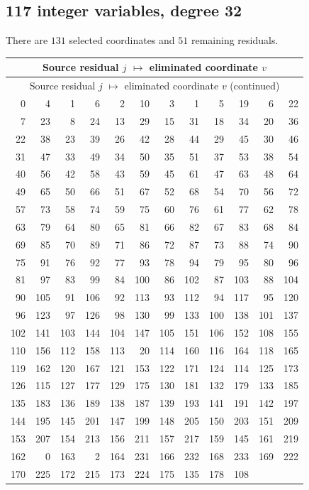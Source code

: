 \subsection{117 integer variables, degree 32}
There are $131$ selected coordinates and $51$ remaining residuals.
\begingroup
\small
\setlength{\tabcolsep}{4pt}
\begin{longtable}{*{6}{r@{\,$\mapsto$\,}r}}
\hline
\multicolumn{12}{c}{Source residual $j$ $\mapsto$ eliminated coordinate $v$}\\
\hline
\endfirsthead
\hline
\multicolumn{12}{c}{Source residual $j$ $\mapsto$ eliminated coordinate $v$ (continued)}\\
\hline
\endhead
0 & 4 & 1 & 6 & 2 & 10 & 3 & 1 & 5 & 19 & 6 & 22 \\
7 & 23 & 8 & 24 & 13 & 29 & 15 & 31 & 18 & 34 & 20 & 36 \\
22 & 38 & 23 & 39 & 26 & 42 & 28 & 44 & 29 & 45 & 30 & 46 \\
31 & 47 & 33 & 49 & 34 & 50 & 35 & 51 & 37 & 53 & 38 & 54 \\
40 & 56 & 42 & 58 & 43 & 59 & 45 & 61 & 47 & 63 & 48 & 64 \\
49 & 65 & 50 & 66 & 51 & 67 & 52 & 68 & 54 & 70 & 56 & 72 \\
57 & 73 & 58 & 74 & 59 & 75 & 60 & 76 & 61 & 77 & 62 & 78 \\
63 & 79 & 64 & 80 & 65 & 81 & 66 & 82 & 67 & 83 & 68 & 84 \\
69 & 85 & 70 & 89 & 71 & 86 & 72 & 87 & 73 & 88 & 74 & 90 \\
75 & 91 & 76 & 92 & 77 & 93 & 78 & 94 & 79 & 95 & 80 & 96 \\
81 & 97 & 83 & 99 & 84 & 100 & 86 & 102 & 87 & 103 & 88 & 104 \\
90 & 105 & 91 & 106 & 92 & 113 & 93 & 112 & 94 & 117 & 95 & 120 \\
96 & 123 & 97 & 126 & 98 & 130 & 99 & 133 & 100 & 138 & 101 & 137 \\
102 & 141 & 103 & 144 & 104 & 147 & 105 & 151 & 106 & 152 & 108 & 155 \\
110 & 156 & 112 & 158 & 113 & 20 & 114 & 160 & 116 & 164 & 118 & 165 \\
119 & 162 & 120 & 167 & 121 & 153 & 122 & 171 & 124 & 114 & 125 & 173 \\
126 & 115 & 127 & 177 & 129 & 175 & 130 & 181 & 132 & 179 & 133 & 185 \\
135 & 183 & 136 & 189 & 138 & 187 & 139 & 193 & 141 & 191 & 142 & 197 \\
144 & 195 & 145 & 201 & 147 & 199 & 148 & 205 & 150 & 203 & 151 & 209 \\
153 & 207 & 154 & 213 & 156 & 211 & 157 & 217 & 159 & 145 & 161 & 219 \\
162 & 0 & 163 & 2 & 164 & 231 & 166 & 232 & 168 & 233 & 169 & 222 \\
170 & 225 & 172 & 215 & 173 & 224 & 175 & 135 & 178 & 108 & \multicolumn{2}{c}{} \\
\hline
\end{longtable}
\endgroup


